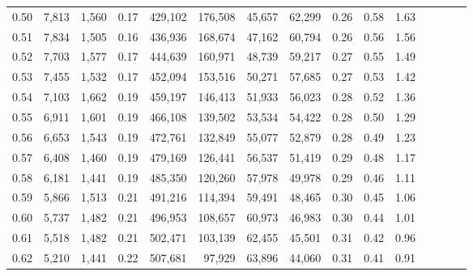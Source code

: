 \begin{tabular}{rrrcrrrrrrrrrrr}
0.50 &   7,813 &   1,560 &                                       0.17 &  429,102 &  176,508 &   45,657 &   62,299 &  0.26 &  0.58 &                         1.63 \\
0.51 &   7,834 &   1,505 &                                       0.16 &  436,936 &  168,674 &   47,162 &   60,794 &  0.26 &  0.56 &                         1.56 \\
0.52 &   7,703 &   1,577 &                                       0.17 &  444,639 &  160,971 &   48,739 &   59,217 &  0.27 &  0.55 &                         1.49 \\
0.53 &   7,455 &   1,532 &                                       0.17 &  452,094 &  153,516 &   50,271 &   57,685 &  0.27 &  0.53 &                         1.42 \\
0.54 &   7,103 &   1,662 &                                       0.19 &  459,197 &  146,413 &   51,933 &   56,023 &  0.28 &  0.52 &                         1.36 \\
0.55 &   6,911 &   1,601 &                                       0.19 &  466,108 &  139,502 &   53,534 &   54,422 &  0.28 &  0.50 &                         1.29 \\
0.56 &   6,653 &   1,543 &                                       0.19 &  472,761 &  132,849 &   55,077 &   52,879 &  0.28 &  0.49 &                         1.23 \\
0.57 &   6,408 &   1,460 &                                       0.19 &  479,169 &  126,441 &   56,537 &   51,419 &  0.29 &  0.48 &                         1.17 \\
0.58 &   6,181 &   1,441 &                                       0.19 &  485,350 &  120,260 &   57,978 &   49,978 &  0.29 &  0.46 &                         1.11 \\
0.59 &   5,866 &   1,513 &                                       0.21 &  491,216 &  114,394 &   59,491 &   48,465 &  0.30 &  0.45 &                         1.06 \\
0.60 &   5,737 &   1,482 &                                       0.21 &  496,953 &  108,657 &   60,973 &   46,983 &  0.30 &  0.44 &                         1.01 \\
0.61 &   5,518 &   1,482 &                                       0.21 &  502,471 &  103,139 &   62,455 &   45,501 &  0.31 &  0.42 &                         0.96 \\
0.62 &   5,210 &   1,441 &                                       0.22 &  507,681 &   97,929 &   63,896 &   44,060 &  0.31 &  0.41 &                         0.91 \\

\end{tabular}
